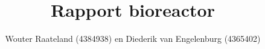 \documentclass[a4paper,11pt]{report}
\title{Rapport bioreactor}
\author{Wouter Raateland (4384938) en Diederik van Engelenburg (4365402)}
\begin{document}
\maketitle

\newpage




\tableofcontents{}
\newpage








%






\end{document}
